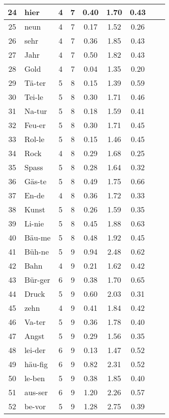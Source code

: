 {\begin{longtable}{clccccccc}
24 & hier & 4 & 7 & 0.40 & 1.70 & 0.43 \\ \hline
25 & neun & 4 & 7 & 0.17 & 1.52 & 0.26 \\ \hline
26 & sehr & 4 & 7 & 0.36 & 1.85 & 0.43 \\ \hline
27 & Jahr & 4 & 7 & 0.50 & 1.82 & 0.43 \\ \hline
28 & Gold & 4 & 7 & 0.04 & 1.35 & 0.20 \\ \hline
29 & Tä-ter & 5 & 8 & 0.15 & 1.39 & 0.59 \\ \hline
30 & Tei-le & 5 & 8 & 0.30 & 1.71 & 0.46 \\ \hline
31 & Na-tur & 5 & 8 & 0.18 & 1.59 & 0.41 \\ \hline
32 & Feu-er & 5 & 8 & 0.30 & 1.71 & 0.45 \\ \hline
33 & Rol-le & 5 & 8 & 0.15 & 1.46 & 0.45 \\ \hline
34 & Rock & 4 & 8 & 0.29 & 1.68 & 0.25 \\ \hline
35 & Spass & 5 & 8 & 0.28 & 1.64 & 0.32 \\ \hline
36 & Gäs-te & 5 & 8 & 0.49 & 1.75 & 0.66 \\ \hline
37 & En-de & 4 & 8 & 0.36 & 1.72 & 0.33 \\ \hline
38 & Kunst & 5 & 8 & 0.26 & 1.59 & 0.35 \\ \hline
39 & Li-nie & 5 & 8 & 0.45 & 1.88 & 0.63 \\ \hline
40 & Bäu-me & 5 & 8 & 0.48 & 1.92 & 0.45 \\ \hline
41 & Büh-ne & 5 & 9 & 0.94 & 2.48 & 0.62 \\ \hline
42 & Bahn & 4 & 9 & 0.21 & 1.62 & 0.42 \\ \hline
43 & Bür-ger & 6 & 9 & 0.38 & 1.70 & 0.65 \\ \hline
44 & Druck & 5 & 9 & 0.60 & 2.03 & 0.31 \\ \hline
45 & zehn & 4 & 9 & 0.41 & 1.84 & 0.42 \\ \hline
46 & Va-ter & 5 & 9 & 0.36 & 1.78 & 0.40 \\ \hline
47 & Angst & 5 & 9 & 0.29 & 1.56 & 0.35 \\ \hline
48 & lei-der & 6 & 9 & 0.13 & 1.47 & 0.52 \\ \hline
49 & häu-fig & 6 & 9 & 0.82 & 2.31 & 0.52 \\ \hline
50 & le-ben & 5 & 9 & 0.38 & 1.85 & 0.40 \\ \hline
51 & aus-ser & 6 & 9 & 1.20 & 2.26 & 0.57 \\ \hline
52 & be-vor & 5 & 9 & 1.28 & 2.75 & 0.39 \\ \hline

\end{longtable}}
